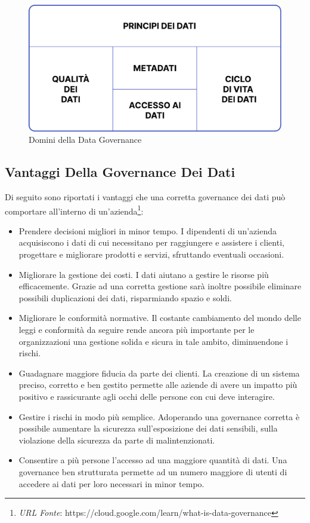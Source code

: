 \begin{figure}[H]
    \centering
    \includegraphics[width=0.75\linewidth]{figure/capitolo_1/Data Governance Dominions.pdf}
    \caption{Domini della Data Governance}
    \label{fig:Data Governance Dominions}
\end{figure}

\subsection{Vantaggi Della Governance Dei Dati}

Di seguito sono riportati i vantaggi che una corretta governance dei dati può comportare all'interno di un'azienda\footnote{\textit{URL Fonte}: https://cloud.google.com/learn/what-is-data-governance}:
\begin{itemize}
    \item Prendere decisioni migliori in minor tempo. I dipendenti di un'azienda acquisiscono i dati di cui necessitano per raggiungere e assistere i clienti, progettare e migliorare prodotti e servizi, sfruttando eventuali occasioni.
    \item Migliorare la gestione dei costi. I dati aiutano a gestire le risorse più efficacemente. Grazie ad una corretta gestione sarà inoltre possibile eliminare possibili duplicazioni dei dati, risparmiando spazio e soldi.
    \item Migliorare le conformità normative. Il costante cambiamento del mondo delle leggi e conformità da seguire rende ancora più importante per le organizzazioni una gestione solida e sicura in tale ambito, diminuendone i rischi.
    \item Guadagnare maggiore fiducia da parte dei clienti. La creazione di un sistema preciso, corretto e ben gestito permette alle aziende di avere un impatto più positivo e rassicurante agli occhi delle persone con cui deve interagire.
    \item Gestire i rischi in modo più semplice. Adoperando una governance corretta è possibile aumentare la sicurezza sull'esposizione dei dati sensibili, sulla violazione della sicurezza da parte di malintenzionati.
    \item Consentire a più persone l'accesso ad una maggiore quantità di dati. Una governance ben strutturata permette ad un numero maggiore di utenti di accedere ai dati per loro necessari in minor tempo.
\end{itemize}

